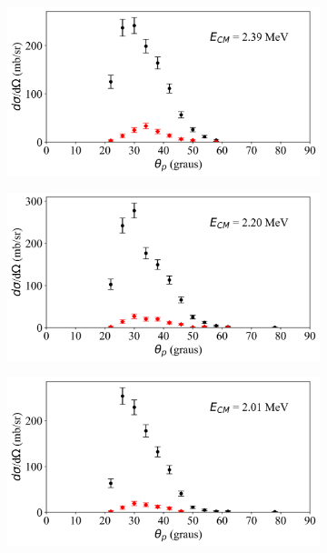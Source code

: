 \documentclass[a4paper,12pt,oneside]{book}
\begin{document}
\begin{figure}[H]
\begin{subfigure}[b]{0.48\textwidth}
        \caption{}
        \label{subfig:dist_ang_r}
    \end{subfigure}
    \begin{subfigure}[b]{0.49\textwidth}
        \centering
        \includegraphics[scale=0.38, width=1.\columnwidth]{figs/dist_angs/dist_ang_18.png}
        \caption{}
        \label{subfig:dist_ang_s}
    \end{subfigure}%
    \hfill
    \begin{subfigure}[b]{0.48\textwidth}
        \centering
        \includegraphics[scale=0.38, width=1.\columnwidth]{figs/dist_angs/dist_ang_19.png}
        \caption{}
        \label{subfig:dist_ang_t}
    \end{subfigure}
    \begin{subfigure}[b]{0.48\textwidth}
        \centering
        \includegraphics[scale=0.38, width=1.\columnwidth]{figs/dist_angs/dist_ang_20.png}

\end{subfigure}
\end{figure}
\end{document}
